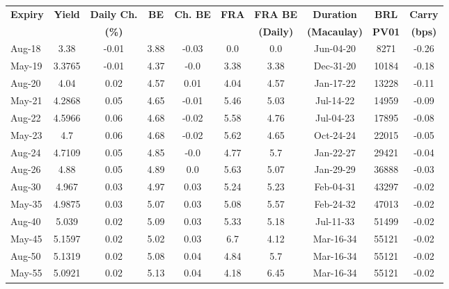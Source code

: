 \documentclass[article,crop=false]{standalone}%
\begin{document}
%
\normalsize%
\setlength{\tabcolsep}{0.15cm}%
\begin{tabular}[h]{l|c c|c c|c c|c c c}%
\hline%
\rowcolor{white}%
\textbf{Expiry}&\textbf{Yield}&\textbf{Daily Ch.}&\textbf{BE}&\textbf{Ch. BE}&\textbf{FRA}&\textbf{FRA BE}&\textbf{Duration}&\textbf{BRL}&\textbf{Carry}\\%
\rowcolor{white}%
\textbf{}&\textbf{}&\textbf{(\%)}&\textbf{}&\textbf{}&\textbf{}&\textbf{(Daily)}&\textbf{(Macaulay)}&\textbf{PV01}&\textbf{(bps)}\\%
\hline%
\rowcolor{lightgray}%
Aug{-}18&3.38&{-}0.01&3.88&{-}0.03&0.0&0.0&Jun{-}04{-}20&8271&{-}0.26\\%
\rowcolor{white}%
May{-}19&3.3765&{-}0.01&4.37&{-}0.0&3.38&3.38&Dec{-}31{-}20&10184&{-}0.18\\%
\rowcolor{lightgray}%
Aug{-}20&4.04&0.02&4.57&0.01&4.04&4.57&Jan{-}17{-}22&13228&{-}0.11\\%
\rowcolor{white}%
May{-}21&4.2868&0.05&4.65&{-}0.01&5.46&5.03&Jul{-}14{-}22&14959&{-}0.09\\%
\rowcolor{lightgray}%
Aug{-}22&4.5966&0.06&4.68&{-}0.02&5.58&4.76&Jul{-}04{-}23&17895&{-}0.08\\%
\rowcolor{white}%
May{-}23&4.7&0.06&4.68&{-}0.02&5.62&4.65&Oct{-}24{-}24&22015&{-}0.05\\%
\rowcolor{lightgray}%
Aug{-}24&4.7109&0.05&4.85&{-}0.0&4.77&5.7&Jan{-}22{-}27&29421&{-}0.04\\%
\rowcolor{white}%
Aug{-}26&4.88&0.05&4.89&0.0&5.63&5.07&Jan{-}29{-}29&36888&{-}0.03\\%
\rowcolor{lightgray}%
Aug{-}30&4.967&0.03&4.97&0.03&5.24&5.23&Feb{-}04{-}31&43297&{-}0.02\\%
\rowcolor{white}%
May{-}35&4.9875&0.03&5.07&0.03&5.08&5.57&Feb{-}24{-}32&47013&{-}0.02\\%
\rowcolor{lightgray}%
Aug{-}40&5.039&0.02&5.09&0.03&5.33&5.18&Jul{-}11{-}33&51499&{-}0.02\\%
\rowcolor{white}%
May{-}45&5.1597&0.02&5.02&0.03&6.7&4.12&Mar{-}16{-}34&55121&{-}0.02\\%
\rowcolor{lightgray}%
Aug{-}50&5.1319&0.02&5.08&0.04&4.84&5.7&Mar{-}16{-}34&55121&{-}0.02\\%
\rowcolor{white}%
May{-}55&5.0921&0.02&5.13&0.04&4.18&6.45&Mar{-}16{-}34&55121&{-}0.02\\%
\hline%
\end{tabular}%
\end{document}
